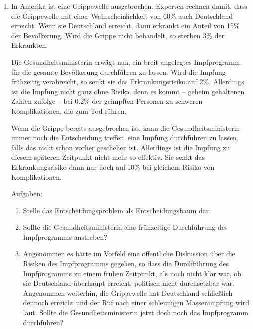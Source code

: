 \begin{enumerate}
  \item In Amerika ist eine Grippewelle ausgebrochen. Experten rechnen damit,
  dass die Grippewelle mit einer Wahrscheinlichkeit von 60\% auch Deutschland
  erreicht. Wenn sie Deutschland erreicht, dann erkrankt ein Anteil von 15\%
  der Bevölkerung. Wird die Grippe nicht behandelt, so sterben 3\% der
  Erkrankten.
 
  Die Gesundheitsministerin erwägt nun, ein breit angelegtes Impfprogramm für
  die gesamte Bevölkerung durchführen zu lassen. Wird die Impfung frühzeitig
  verabreicht, so senkt sie das Erkrankungsrisiko auf 2\%. Allerdings ist die
  Impfung nicht ganz ohne Risiko, denn es kommt -- geheim gehaltenen Zahlen
  zufolge -- bei 0.2\% der geimpften Personen zu schweren Komplikationen, die
  zum Tod führen.
  
  Wenn die Grippe bereits ausgebrochen ist, kann die Gesundheitsministerin
  immer noch die Entscheidung treffen, eine Impfung durchführen zu lassen,
  falls das nicht schon vorher geschehen ist. Allerdings ist die Impfung zu
  diesem späteren Zeitpunkt nicht mehr so effektiv. Sie senkt das
  Erkrankungsrisiko dann nur noch auf 10\% bei gleichem Risiko von
  Komplikationen.

  Aufgaben:
  \begin{enumerate}
  \item Stelle das Entscheidungsproblem als Entscheidungsbaum dar.
  \item Sollte die Gesundheitsministerin eine frühzeitige Durchführung des
  Impfprogramms anstreben?
  \item Angenommen es hätte im Vorfeld eine öffentliche Diskussion über die
  Risiken des Impfprogramms gegeben, so dass die Durchführung des Impfprogramms
  zu einem frühen Zeitpunkt, als noch nicht klar war, ob sie Deutschland
  überhaupt erreicht, politisch nicht durchsetzbar war. Angenommen weiterhin,
  die Grippewelle hat Deutschland schließlich dennoch erreicht und der Ruf nach
  einer schleunigen Massenimpfung wird laut. Sollte die Gesundheitsministerin jetzt 
  doch noch das Impfprogramm durchführen?
  \end{enumerate}
  

\end{enumerate}
